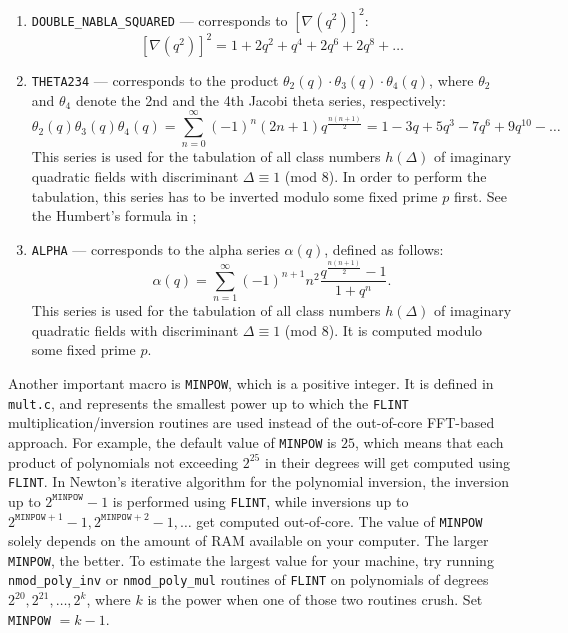 \documentclass[a4paper,10pt]{article}
\newcommand{\code}{\lstinline}
\begin{document}
\begin{enumerate}
\item \code{DOUBLE_NABLA_SQUARED} --- corresponds to $\left[\nabla(q^2)\right]^2$:
%
$$
\left[\nabla(q^2)\right]^2 = 1 + 2q^2 + q^4 + 2q^6 + 2q^8 + \ldots
$$

\item \code{THETA234} --- corresponds to the product $\theta_2(q) \cdot \theta_3(q) \cdot \theta_4(q)$, where $\theta_2$ and $\theta_4$ denote the 2nd and the 4th Jacobi theta series, respectively:
%
$$
\theta_2(q)\theta_3(q)\theta_4(q) = \sum\limits_{n = 0}^\infty(-1)^n(2n+1)q^{\frac{n(n+1)}{2}} = 1 - 3q + 5q^3 - 7q^6 + 9q^{10} - \ldots
$$
%
This series is used for the tabulation of all class numbers $h(\Delta)$ of imaginary quadratic fields with discriminant $\Delta \equiv 1$ (mod 8). In order to perform the tabulation, this series has to be inverted modulo some fixed prime $p$ first. See the Humbert's formula in \cite[Section 7.1]{mosunov};

\item \code{ALPHA} --- corresponds to the alpha series $\alpha(q)$, defined as follows:
%
$$
\alpha(q) = \sum\limits_{n = 1}^\infty(-1)^{n+1}n^2\frac{q^{\frac{n(n+1)}{2}} - 1}{1 + q^n}.
$$
%
This series is used for the tabulation of all class numbers $h(\Delta)$ of imaginary quadratic fields with discriminant $\Delta \equiv 1$ (mod 8). It is computed modulo some fixed prime $p$.
\end{enumerate}

Another important macro is \code{MINPOW}, which is a positive integer. It is defined in \code{mult.c}, and represents the smallest power up to which the \code{FLINT} multiplication/inversion routines are used instead of the out-of-core FFT-based approach. For example, the default value of \code{MINPOW} is $25$, which means that each product of polynomials not exceeding $2^{25}$ in their degrees will get computed using \code{FLINT}. In Newton's iterative algorithm for the polynomial inversion, the inversion up to $2^{\texttt{MINPOW}} - 1$ is performed using \code{FLINT}, while inversions up to $2^{\texttt{MINPOW} + 1} - 1,  2^{\texttt{MINPOW} + 2} - 1, \ldots$ get computed out-of-core. The value of \code{MINPOW} solely depends on the amount of RAM available on your computer. The larger \code{MINPOW}, the better. To estimate the largest value for your machine, try running \code{nmod_poly_inv} or \code{nmod_poly_mul} routines of \code{FLINT} on polynomials of degrees $2^{20}, 2^{21}, \ldots, 2^k$, where $k$ is the power when one of those two routines crush. Set \code{MINPOW} $= k - 1$.
\end{document}
